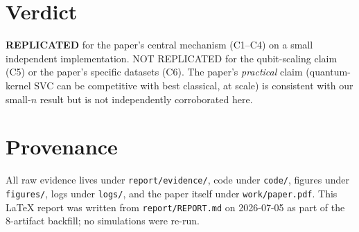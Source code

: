\documentclass[11pt]{article}
\begin{document}
\section{Verdict}

\textbf{REPLICATED} for the paper's central mechanism (C1--C4) on a small
independent implementation. NOT REPLICATED for the qubit-scaling claim (C5)
or the paper's specific datasets (C6). The paper's \emph{practical} claim
(quantum-kernel SVC can be competitive with best classical, at scale) is
consistent with our small-$n$ result but is not independently corroborated
here.



\section{Provenance}

All raw evidence lives under \texttt{report/evidence/}, code under \texttt{code/},
figures under \texttt{figures/}, logs under \texttt{logs/}, and the paper itself
under \texttt{work/paper.pdf}. This LaTeX report was written from
\texttt{report/REPORT.md} on 2026-07-05 as part of the 8-artifact backfill;
no simulations were re-run.
\end{document}
